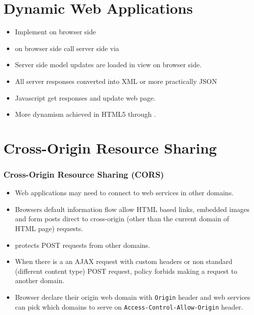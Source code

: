 \documentclass[trans,compress,xcolor=table]{beamer}
\begin{document}
\section{Dynamic Web Applications}
\begin{frame}[fragile]
\begin{itemize}
\item Implement  on browser side
\item {} on browser side call server side 
	 via 
\item Server side model updates are loaded in view on browser side.
\item All server responses converted into XML or more practically JSON
\item Javascript get responses and update web page.
\item More dynamism achieved in HTML5 through .
\end{itemize}
\end{frame}

\section{Cross-Origin Resource Sharing}
\begin{frame}[fragile]
\frametitle{Cross-Origin Resource Sharing (CORS)}
\begin{itemize}
\item Web applications may need to connect to web services in other domains.
\item Browsers default information flow allow HTML based links, embedded images and form posts
	direct to cross-origin (other than the current domain of HTML page) requests.
\item {} protects POST requests from other domains.
\item When there is a an AJAX request with custom headers or non standard (different content type)
	POST request,  policy forbids making a request to another domain.
\item Browser declare their origin web domain with \lstinline!Origin! header and 
	web services can pick which domains to serve on \lstinline!Access-Control-Allow-Origin! header.
\end{itemize}
\end{frame}
\end{document}
